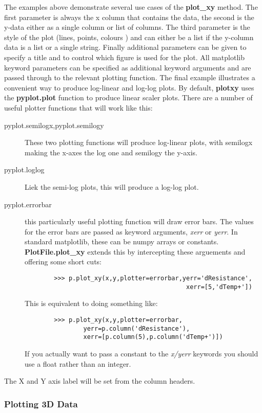 \documentclass[a4paper,11pt]{scrartcl}
\begin{document}
The examples above demonstrate several use cases of the \textbf{plot\_xy} method. The first parameter is always the x column that contains the data, the second is the y-data either as a single column or list of columns. The third parameter is the style of the plot (lines, points, colours \etc) and can either be a list if the y-column data is a list or a single string. Finally additional parameters can be given to specify a title and to control which figure is used for the plot. All matplotlib keyword parameters can be specified as additional keyword arguments and are passed through to the relevant plotting function. The final example illustrates a convenient way to produce log-linear and log-log plots. By default, \textbf{plotxy} uses the \textbf{pyplot.plot} function to produce linear scaler plots. There are a number of useful plotter functions that will work like this:
\begin{description}
  \item[pyplot.semilogx,pyplot.semilogy] These two plotting functions will produce log-linear plots, with semilogx making the x-axes the log one and semilogy the y-axis.
  \item[pyplot.loglog] Liek the semi-log plots, this will produce a log-log plot.
  \item[pyplot.errorbar] this particularly useful plotting function will draw error bars. The values for the error bars are passed as keyword arguments, \textit{xerr} or \textit{yerr}. In standard matplotlib, these can be numpy arrays or constants. \textbf{PlotFile.plot\_xy} extends this by intercepting these arguements and offering some short cuts:
      \begin{verbatim}
        >>> p.plot_xy(x,y,plotter=errorbar,yerr='dResistance',
                                            xerr=[5,'dTemp+'])
      \end{verbatim}
      This is equivalent to doing something like:
       \begin{verbatim}
        >>> p.plot_xy(x,y,plotter=errorbar,
                yerr=p.column('dResistance'),
                xerr=[p.column(5),p.column('dTemp+')])
      \end{verbatim}
    If you actually want to pass a constant to the \textit{x/yerr} keywords you should use a float rather than an integer.
\end{description}

The X and Y axis label will be set from the column headers.

\subsubsection{Plotting 3D Data}
\end{document}
